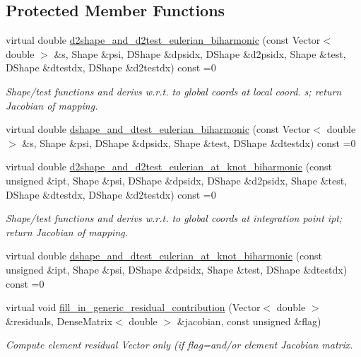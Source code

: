 \subsection*{Protected Member Functions}
\begin{DoxyCompactItemize}
\item 
virtual double \hyperlink{classoomph_1_1MyBiharmonicEquations_a4597b3938b6f1244d6e8e0f58250c14a}{d2shape\+\_\+and\+\_\+d2test\+\_\+eulerian\+\_\+biharmonic} (const Vector$<$ double $>$ \&s, Shape \&psi, D\+Shape \&dpsidx, D\+Shape \&d2psidx, Shape \&test, D\+Shape \&dtestdx, D\+Shape \&d2testdx) const =0
\begin{DoxyCompactList}\small\item\em Shape/test functions and derivs w.\+r.\+t. to global coords at local coord. s; return Jacobian of mapping. \end{DoxyCompactList}\item 
virtual double \hyperlink{classoomph_1_1MyBiharmonicEquations_a084eaadd62185dad622c7708862f023a}{dshape\+\_\+and\+\_\+dtest\+\_\+eulerian\+\_\+biharmonic} (const Vector$<$ double $>$ \&s, Shape \&psi, D\+Shape \&dpsidx, Shape \&test, D\+Shape \&dtestdx) const =0
\item 
virtual double \hyperlink{classoomph_1_1MyBiharmonicEquations_a85687f39c0fb72f25ce67f5867a83470}{d2shape\+\_\+and\+\_\+d2test\+\_\+eulerian\+\_\+at\+\_\+knot\+\_\+biharmonic} (const unsigned \&ipt, Shape \&psi, D\+Shape \&dpsidx, D\+Shape \&d2psidx, Shape \&test, D\+Shape \&dtestdx, D\+Shape \&d2testdx) const =0
\begin{DoxyCompactList}\small\item\em Shape/test functions and derivs w.\+r.\+t. to global coords at integration point ipt; return Jacobian of mapping. \end{DoxyCompactList}\item 
virtual double \hyperlink{classoomph_1_1MyBiharmonicEquations_a08e45fddb2c25119e6ba826cd6cafdbf}{dshape\+\_\+and\+\_\+dtest\+\_\+eulerian\+\_\+at\+\_\+knot\+\_\+biharmonic} (const unsigned \&ipt, Shape \&psi, D\+Shape \&dpsidx, Shape \&test, D\+Shape \&dtestdx) const =0
\item 
virtual void \hyperlink{classoomph_1_1MyBiharmonicEquations_ad951338582f7807eb83999e09f7486ec}{fill\+\_\+in\+\_\+generic\+\_\+residual\+\_\+contribution} (Vector$<$ double $>$ \&residuals, Dense\+Matrix$<$ double $>$ \&jacobian, const unsigned \&flag)
\begin{DoxyCompactList}\small\item\em Compute element residual Vector only (if flag=and/or element Jacobian matrix. \end{DoxyCompactList}\end{DoxyCompactItemize}
